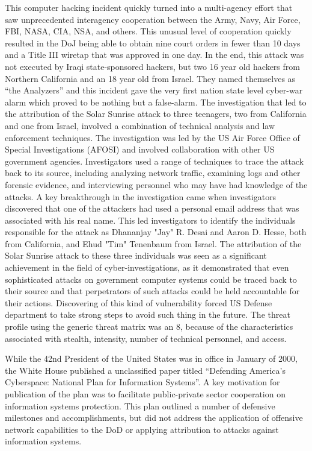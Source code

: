 \documentclass[12pt]{report}
\begin{document}
This computer hacking incident quickly turned into a multi-agency effort that saw unprecedented interagency cooperation between the Army, Navy, Air Force, FBI, NASA, CIA, NSA, and others.  This unusual level of cooperation quickly resulted in the DoJ being able to obtain nine court orders in fewer than 10 days and a Title III wiretap that was approved in one day.  In the end, this attack was not executed by Iraqi state-sponsored hackers, but two 16 year old hackers from Northern California and an 18 year old from Israel.  They named themselves as “the Analyzers” and this incident gave the very first nation state level cyber-war alarm which proved to be nothing but a false-alarm.  The investigation that led to the attribution of the Solar Sunrise attack to three teenagers, two from California and one from Israel, involved a combination of technical analysis and law enforcement techniques.  The investigation was led by the US Air Force Office of Special Investigations (AFOSI) and involved collaboration with other US government agencies.  Investigators used a range of techniques to trace the attack back to its source, including analyzing network traffic, examining logs and other forensic evidence, and interviewing personnel who may have had knowledge of the attacks.  A key breakthrough in the investigation came when investigators discovered that one of the attackers had used a personal email address that was associated with his real name.  This led investigators to identify the individuals responsible for the attack as Dhananjay "Jay" R. Desai and Aaron D. Hesse, both from California, and Ehud "Tim" Tenenbaum from Israel.  The attribution of the Solar Sunrise attack to these three individuals was seen as a significant achievement in the field of cyber-investigations, as it demonstrated that even sophisticated attacks on government computer systems could be traced back to their source and that perpetrators of such attacks could be held accountable for their actions.  Discovering of this kind of vulnerability forced US Defense department to take strong steps to avoid such thing in the future.  \cite{purohitcyber}  The threat profile using the generic threat matrix was an 8, because of the characteristics associated with stealth, intensity, number of technical personnel, and access.

While the 42nd President of the United States was in office in January of 2000, the White House published a unclassified paper titled “Defending America's Cyberspace: National Plan for Information Systems”.  A key motivation for publication of the plan was to facilitate public-private sector cooperation on information systems protection. This plan outlined a number of defensive milestones and accomplishments, but did not address the application of offensive network capabilities to the DoD or applying attribution to attacks against information systems. \cite{cip-plan:2000}  
\end{document}
